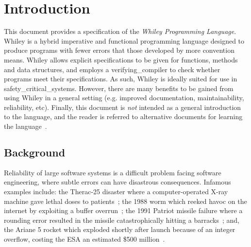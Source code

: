 \chapter{Introduction}

This document provides a specification of the {\em Whiley Programming
  Language}.  Whiley is a hybrid imperative and functional programming
language designed to produce programs with fewer errors that those
developed by more convention means.  Whiley allows explicit
specifications to be given for functions, methods and data structures,
and employs a \gls{verifying_compiler} to check whether programs meet their specifications.  As such, Whiley is ideally suited
for use in \gls{safety_critical_system}s.  However, there are many
benefits to be gained from using Whiley in a general setting
(e.g. improved documentation, maintainability, reliability, etc).
Finally, this document is {\em not} intended as a general introduction
to the language, and the reader is referred to alternative documents
for learning the language~\cite{Pearce14a}.


\section{Background}

Reliability of large software systems is a difficult problem facing
software engineering, where subtle errors can have disastrous
consequences.  Infamous examples include: the Therac-25 disaster where
a computer-operated X-ray machine gave lethal doses to
patients~\cite{LT93}; the 1988 worm which reeked havoc on the internet
by exploiting a buffer overrun~\cite{ER89}; the 1991 Patriot missile
failure where a rounding error resulted in the missile catastrophically
hitting a barracks~\cite{GAO}; and, the Ariane 5 rocket which exploded
shortly after launch because of an integer overflow, costing the ESA
an estimated \$500 million~\cite{ARIAN5}.


